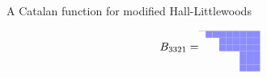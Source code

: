 \documentclass[dvipsnames]{beamer}
\theoremstyle{definition}
\newcommand{\qtrootcolor}{blue!45}
\begin{document}
\begin{frame}{A Catalan function for modified Hall-Littlewoods}

  {\small {}}
\vspace{.4mm}
\vspace{-4.4mm}
\begin{align*}
\raisebox{6.7mm}{${B_{3321} = }$}
\begin{tikzpicture}[scale=.213]
\draw[draw = none, fill = \qtrootcolor] (2,-1) rectangle (3,-2);
 \draw[draw = none, fill = \qtrootcolor] (3,-1) rectangle (4,-2);
 \draw[draw = none, fill = \qtrootcolor] (4,-1) rectangle (5,-2);
 \draw[draw = none, fill = \qtrootcolor] (4,-2) rectangle (5,-3);
 \draw[draw = none, fill = \qtrootcolor] (4,-3) rectangle (5,-4);
 \draw[draw = none, fill = \qtrootcolor] (5,-1) rectangle (6,-2);
 \draw[draw = none, fill = \qtrootcolor] (5,-2) rectangle (6,-3);
 \draw[draw = none, fill = \qtrootcolor] (5,-3) rectangle (6,-4);
 \draw[draw = none, fill = \qtrootcolor] (6,-1) rectangle (7,-2);
 \draw[draw = none, fill = \qtrootcolor] (6,-2) rectangle (7,-3);
 \draw[draw = none, fill = \qtrootcolor] (6,-3) rectangle (7,-4);
 \draw[draw = none, fill = \qtrootcolor] (7,-1) rectangle (8,-2);
 \draw[draw = none, fill = \qtrootcolor] (7,-2) rectangle (8,-3);
 \draw[draw = none, fill = \qtrootcolor] (7,-3) rectangle (8,-4);
 \draw[draw = none, fill = \qtrootcolor] (7,-4) rectangle (8,-5);
 \draw[draw = none, fill = \qtrootcolor] (7,-5) rectangle (8,-6);
 \draw[draw = none, fill = \qtrootcolor] (7,-6) rectangle (8,-7);
 \draw[draw = none, fill = \qtrootcolor] (8,-1) rectangle (9,-2);
 \draw[draw = none, fill = \qtrootcolor] (8,-2) rectangle (9,-3);
 \draw[draw = none, fill = \qtrootcolor] (8,-3) rectangle (9,-4);
 \draw[draw = none, fill = \qtrootcolor] (8,-4) rectangle (9,-5);
 \draw[draw = none, fill = \qtrootcolor] (8,-5) rectangle (9,-6);
 \draw[draw = none, fill = \qtrootcolor] (8,-6) rectangle (9,-7);
 \draw[draw = none, fill = \qtrootcolor] (9,-1) rectangle (10,-2);
 \draw[draw = none, fill = \qtrootcolor] (9,-2) rectangle (10,-3);
 \draw[draw = none, fill = \qtrootcolor] (9,-3) rectangle (10,-4);
 \draw[draw = none, fill = \qtrootcolor] (9,-4) rectangle (10,-5);
 \draw[draw = none, fill = \qtrootcolor] (9,-5) rectangle (10,-6);
 \draw[draw = none, fill = \qtrootcolor] (9,-6) rectangle (10,-7);
 \draw[thin, black!31] (1,-1) -- (10,-1);
\draw[thin, black!31] (2,-1) -- (2,-1);
\draw[thin, black!31] (2,-2) -- (10,-2);
\draw[thin, black!31] (3,-2) -- (3,-1);

\end{tikzpicture}
\end{align*}
\end{frame}
\end{document}
